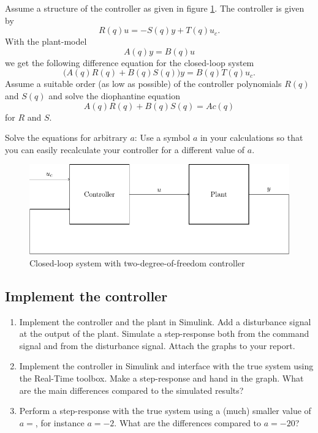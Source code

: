 \documentclass{scrartcl}
\begin{document}
   Assume a structure of the controller as given in figure \ref{fig:2dof}. The controller is given by 
   \[ R(q)u = -S(q)y + T(q)u_c. \]
   With the plant-model
   \[ A(q)y = B(q)u\]
   we get the following difference equation for the closed-loop system
   \[ \big( A(q)R(q) + B(q)S(q) \big) y = B(q)T(q) u_c. \]
   Assume a suitable order (as low as possible) of the controller polynomials $R(q)$ and $S(q)$ and solve the diophantine equation 
   \[ A(q)R(q) + B(q)S(q)  = Ac(q) \]
   for $R$ and $S$. 

   Solve the equations for arbitrary $a$: Use a symbol $a$ in your calculations so that you can easily recalculate your controller for a different value of $a$. 

   \begin{figure}
   \begin{center}
   \includegraphics[width=0.6\linewidth]{2dof-block}
   \caption{Closed-loop system with two-degree-of-freedom controller}
   \label{fig:2dof}
   \end{center}
   \end{figure}
\subsection{Implement the controller}
\label{sec-1-4}

\begin{enumerate}
\item Implement the controller and the plant in Simulink. Add a disturbance signal at the output of the plant. Simulate a step-response both from the command signal and from the disturbance signal. Attach the graphs to your report.
\item Implement the controller in Simulink and interface with the true system using the Real-Time toolbox. Make a step-response and hand in the graph. What are the main differences compared to the simulated results?
\item Perform a step-response with the true system using a (much) smaller value of $a=$, for instance $a=-2$. What are the differences compared to $a=-20$?
\end{enumerate}
\end{document}
